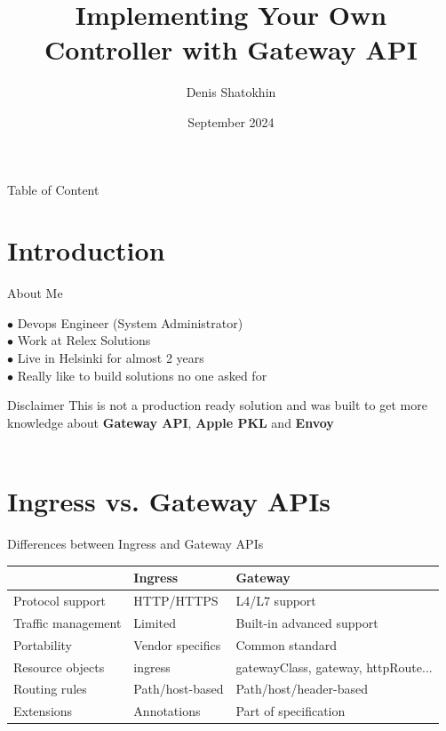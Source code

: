 \documentclass[11pt, aspectratio=169]{beamer}
\title[Building Helm replacement]{Implementing Your Own Controller with Gateway API}
\author{Denis Shatokhin}
\date{September 2024}
\begin{document}
\maketitle

\begin{frame}{ Table of Content}
	\tableofcontents
\end{frame}

\section{Introduction}

\begin{frame}{ About Me}
	\begin{description}
		\item [$\bullet$ Devops Engineer (System Administrator)]
		\item [$\bullet$ Work at Relex Solutions]
		\item [$\bullet$ Live in Helsinki for almost 2 years]
		\item [$\bullet$ Really like to build solutions no one asked for]
	\end{description}
\end{frame}

\begin{frame}{ Disclaimer}
	This is not a production ready solution and was
	built to get more knowledge about \textbf{Gateway API}, \textbf{Apple PKL} and \textbf{Envoy}\\~\\

	\centerline{{\Huge {}}}
\end{frame}

\section{Ingress vs. Gateway APIs}

\begin{frame}{ Differences between Ingress and Gateway APIs}
	\begin{tabular}{ |l||l|l| }
		\hline
		                   & \textbf{Ingress} & \textbf{Gateway}                    \\
		\hline\hline
		Protocol support   & HTTP/HTTPS       & L4/L7 support                       \\
		\hline
		Traffic management & Limited          & Built-in advanced support           \\
		\hline
		Portability        & Vendor specifics & Common standard                     \\
		\hline
		Resource objects   & ingress          & gatewayClass, gateway, httpRoute... \\
		\hline
		Routing rules      & Path/host-based  & Path/host/header-based              \\
		\hline
		Extensions         & Annotations      & Part of specification               \\
		\hline
	\end{tabular}
\end{frame}
\end{document}

